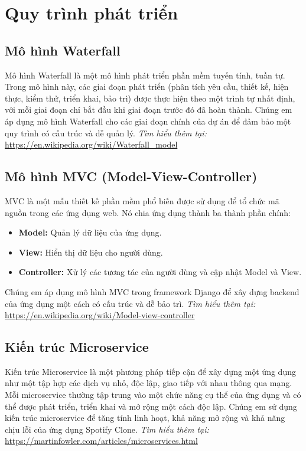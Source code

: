 \section{Quy trình phát triển}
\label{sec:dev_process}

\subsection{Mô hình Waterfall}
Mô hình Waterfall là một mô hình phát triển phần mềm tuyến tính, tuần tự. Trong mô hình này, các giai đoạn phát triển (phân tích yêu cầu, thiết kế, hiện thực, kiểm thử, triển khai, bảo trì) được thực hiện theo một trình tự nhất định, với mỗi giai đoạn chỉ bắt đầu khi giai đoạn trước đó đã hoàn thành. Chúng em áp dụng mô hình Waterfall cho các giai đoạn chính của dự án để đảm bảo một quy trình có cấu trúc và dễ quản lý.
\textit{Tìm hiểu thêm tại:} \url{https://en.wikipedia.org/wiki/Waterfall_model}

\subsection{Mô hình MVC (Model-View-Controller)}
MVC là một mẫu thiết kế phần mềm phổ biến được sử dụng để tổ chức mã nguồn trong các ứng dụng web. Nó chia ứng dụng thành ba thành phần chính:
\begin{itemize}
    \item \textbf{Model:} Quản lý dữ liệu của ứng dụng.
    \item \textbf{View:} Hiển thị dữ liệu cho người dùng.
    \item \textbf{Controller:} Xử lý các tương tác của người dùng và cập nhật Model và View.
\end{itemize}
Chúng em áp dụng mô hình MVC trong framework Django để xây dựng backend của ứng dụng một cách có cấu trúc và dễ bảo trì.
\textit{Tìm hiểu thêm tại:} \url{https://en.wikipedia.org/wiki/Model-view-controller}

\subsection{Kiến trúc Microservice}
Kiến trúc Microservice là một phương pháp tiếp cận để xây dựng một ứng dụng như một tập hợp các dịch vụ nhỏ, độc lập, giao tiếp với nhau thông qua mạng. Mỗi microservice thường tập trung vào một chức năng cụ thể của ứng dụng và có thể được phát triển, triển khai và mở rộng một cách độc lập. Chúng em sử dụng kiến trúc microservice để tăng tính linh hoạt, khả năng mở rộng và khả năng chịu lỗi của ứng dụng Spotify Clone.
\textit{Tìm hiểu thêm tại:} \url{https://martinfowler.com/articles/microservices.html}

